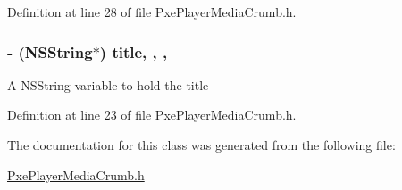 Definition at line 28 of file Pxe\-Player\-Media\-Crumb.\-h.

\hypertarget{interface_pxe_player_media_crumb_a9f0fb13437b39aa1b9f3873798ef5ff5}{
\subsubsection[{title}]{\setlength{\rightskip}{0pt plus 5cm}-\/ (N\-S\-String$\ast$) title\hspace{0.3cm}{\ttfamily [read]}, {\ttfamily [write]}, {\ttfamily [nonatomic]}, {\ttfamily [strong]}}}\label{interface_pxe_player_media_crumb_a9f0fb13437b39aa1b9f3873798ef5ff5}
A N\-S\-String variable to hold the title 

Definition at line 23 of file Pxe\-Player\-Media\-Crumb.\-h.



The documentation for this class was generated from the following file\-:\begin{DoxyCompactItemize}
\item 
\hyperlink{_pxe_player_media_crumb_8h}{Pxe\-Player\-Media\-Crumb.\-h}\end{DoxyCompactItemize}
